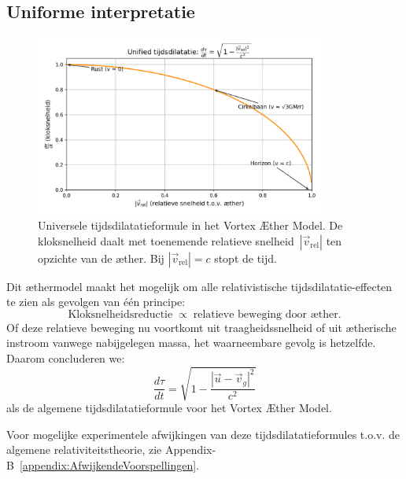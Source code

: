 \subsection*{Uniforme interpretatie}
\begin{figure}[htbp]
    \centering
    \includegraphics[width=0.85\textwidth]{11-TijdsvertragingRelatieveBeweging}
    \caption{Universele tijdsdilatatieformule in het Vortex Æther Model. De kloksnelheid daalt met toenemende relatieve snelheid~$|\vec{v}_{\mathrm{rel}}|$ ten opzichte van de æther. Bij $|\vec{v}_{\mathrm{rel}}| = c$ stopt de tijd.}
    \label{fig:TijdsvertragingRelatieveBeweging}
\end{figure}

Dit æthermodel maakt het mogelijk om alle relativistische tijdsdilatatie-effecten te zien als gevolgen van één principe:
\[
    \text{Kloksnelheidsreductie} \;\propto\; \text{relatieve beweging door æther}.
\]
Of deze relatieve beweging nu voortkomt uit traagheidssnelheid of uit ætherische instroom vanwege nabijgelegen massa, het waarneembare gevolg is hetzelfde. Daarom concluderen we:
\[
    \boxed{\frac{d\tau}{dt} = \sqrt{1 - \frac{|\vec{u} - \vec{v}_g|^2}{c^2}}}
\]
als de algemene tijdsdilatatieformule voor het Vortex Æther Model.

Voor mogelijke experimentele afwijkingen van deze tijdsdilatatieformules t.o.v. de algemene relativiteitstheorie, zie Appendix-B~\ref{appendix:AfwijkendeVoorspellingen}.